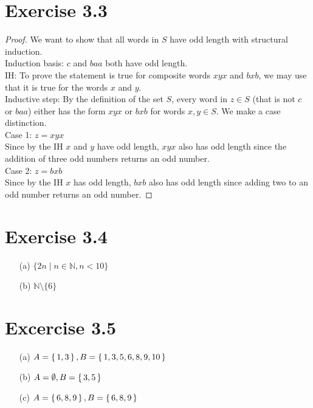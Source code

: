 \documentclass{article} %
\newcommand{\homeworkNumber}{3}
\begin{document}
\section*{Exercise \homeworkNumber.3}

\begin{proof}
We want to show that all words in $S$ have odd length with structural induction.\\
Induction basis: $c$ and $baa$ both have odd length.\\
IH: To prove the statement is true for composite words $xyx$ and $bxb$, we may use that it is true for the words $x$ and $y$.\\
Inductive step: By the definition of the set $S$, every word in $z \in S$ (that is not $c$ or $baa$) either has the form $xyx$ or $bxb$ for words $x,y \in S$. We make a case distinction.\\
Case 1: $z = xyx$\\
Since by the IH $x$ and $y$ have odd length, $xyx$ also has odd length since the addition of three odd numbers returns an odd number.\\
Case 2: $z = bxb$\\
Since by the IH $x$ has odd length, $bxb$ also has odd length since adding two to an odd number returns an odd number.
\end{proof}

\section*{Exercise \homeworkNumber.4}

\begin{enumerate}

\item[(a)] $\{2n \mid n \in \mathbb{N}, n < 10\}$

\item[(b)] $\mathbb{N} \setminus \{6\}$

\end{enumerate}


\section*{Excercise \homeworkNumber.5}

\begin{enumerate}

\item[(a)] $A = \set{1,3}, B = \set{1,3,5,6,8,9,10}$
\item[(b)] $A = \emptyset, B = \set{3,5}$
\item[(c)] $A = \set{6,8,9}, B = \set{6,8,9}$



\end{enumerate}
\end{document}
